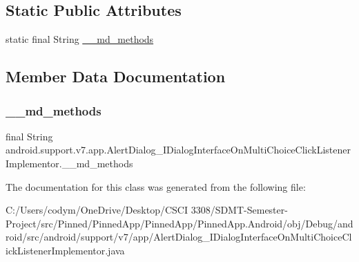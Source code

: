 \subsection*{Static Public Attributes}
\begin{DoxyCompactItemize}
\item 
static final String \hyperlink{classandroid_1_1support_1_1v7_1_1app_1_1_alert_dialog___i_dialog_interface_on_multi_choice_click_listener_implementor_a0883fdfc11be8aa3d8e24db60ec91986}{\+\_\+\+\_\+md\+\_\+methods}
\end{DoxyCompactItemize}


\subsection{Member Data Documentation}
\mbox{\label{classandroid_1_1support_1_1v7_1_1app_1_1_alert_dialog___i_dialog_interface_on_multi_choice_click_listener_implementor_a0883fdfc11be8aa3d8e24db60ec91986}} 
\subsubsection{\texorpdfstring{\+\_\+\+\_\+md\+\_\+methods}{\_\_md\_methods}}
{\footnotesize\ttfamily final String android.\+support.\+v7.\+app.\+Alert\+Dialog\+\_\+\+I\+Dialog\+Interface\+On\+Multi\+Choice\+Click\+Listener\+Implementor.\+\_\+\+\_\+md\+\_\+methods\hspace{0.3cm}{\ttfamily [static]}}



The documentation for this class was generated from the following file\+:\begin{DoxyCompactItemize}
\item 
C\+:/\+Users/codym/\+One\+Drive/\+Desktop/\+C\+S\+C\+I 3308/\+S\+D\+M\+T-\/\+Semester-\/\+Project/src/\+Pinned/\+Pinned\+App/\+Pinned\+App/\+Pinned\+App.\+Android/obj/\+Debug/android/src/android/support/v7/app/Alert\+Dialog\+\_\+\+I\+Dialog\+Interface\+On\+Multi\+Choice\+Click\+Listener\+Implementor.\+java\end{DoxyCompactItemize}
